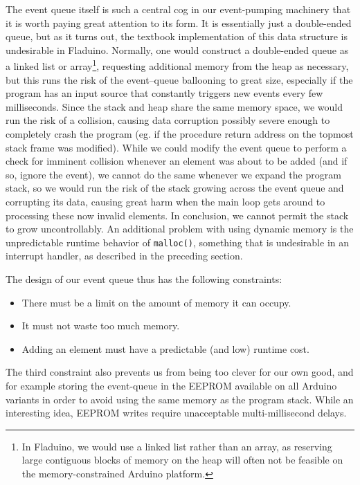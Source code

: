 \documentclass[a4paper, oneside, final]{memoir}
\begin{document}
The event queue itself is such a central cog in our event-pumping
machinery that it is worth paying great attention to its form.  It is
essentially just a double-ended queue, but as it turns out, the
textbook implementation of this data structure is undesirable in
Fladuino.  Normally, one would construct a double-ended queue as a
linked list or array\footnote{In Fladuino, we would use a linked list
  rather than an array, as reserving large contiguous blocks of memory
  on the heap will often not be feasible on the memory-constrained
  Arduino platform.}, requesting additional memory from the heap as
necessary, but this runs the risk of the event--queue ballooning to
great size, especially if the program has an input source that
constantly triggers new events every few milliseconds.  Since the
stack and heap share the same memory space, we would run the risk of a
collision, causing data corruption possibly severe enough to
completely crash the program (eg. if the procedure return address on
the topmost stack frame was modified).  While we could modify the
event queue to perform a check for imminent collision whenever an
element was about to be added (and if so, ignore the event), we cannot
do the same whenever we expand the program stack, so we would run the
risk of the stack growing across the event queue and corrupting its
data, causing great harm when the main loop gets around to processing
these now invalid elements.  In conclusion, we cannot permit the stack
to grow uncontrollably.  An additional problem with using dynamic
memory is the unpredictable runtime behavior of \texttt{malloc()},
something that is undesirable in an interrupt handler, as described in
the preceding section.

The design of our event queue thus has the following constraints:

\begin{itemize}
\item There must be a limit on the amount of memory it can occupy.
\item It must not waste too much memory.
\item Adding an element must have a predictable (and low) runtime
  cost.
\end{itemize}

The third constraint also prevents us from being too clever for our
own good, and for example storing the event-queue in the EEPROM
available on all Arduino variants in order to avoid using the same
memory as the program stack.  While an interesting idea, EEPROM writes
require unacceptable multi-millisecond delays.
\end{document}
